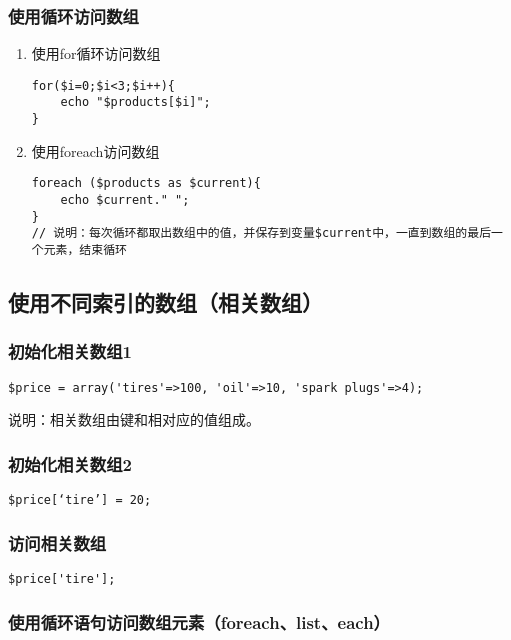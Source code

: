 \documentclass[11pt]{article}
\begin{document}
\subsubsection{使用循环访问数组}
\label{sec:org8341220}
\begin{enumerate}
\item 使用for循环访问数组
\label{sec:orgb07d2e4}
\begin{verbatim}
for($i=0;$i<3;$i++){
    echo "$products[$i]";
}
\end{verbatim}
\item 使用foreach访问数组
\label{sec:orgdd860d7}
\begin{verbatim}
foreach ($products as $current){
    echo $current." ";
}
// 说明：每次循环都取出数组中的值，并保存到变量$current中，一直到数组的最后一个元素，结束循环
\end{verbatim}
\end{enumerate}
\subsection{使用不同索引的数组（相关数组）}
\label{sec:org899a65e}
\subsubsection{初始化相关数组1}
\label{sec:orgbb507e1}
\begin{verbatim}
$price = array('tires'=>100, 'oil'=>10, 'spark plugs'=>4);
\end{verbatim}
说明：相关数组由键和相对应的值组成。

\subsubsection{初始化相关数组2}
\label{sec:org9f9a1d0}
\begin{verbatim}
$price[‘tire’] = 20;
\end{verbatim}
\subsubsection{访问相关数组}
\label{sec:orgf863931}
\begin{verbatim}
$price['tire'];
\end{verbatim}
\subsubsection{使用循环语句访问数组元素（foreach、list、each）}
\label{sec:org6c97581}
\end{document}
